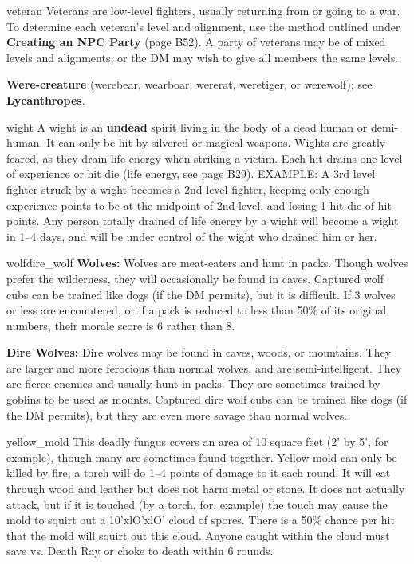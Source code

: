\documentclass[letterpaper,serif,tightsqueeze]{module}
\begin{document}
\begin{newmonster}{veteran}
Veterans are low-level fighters, usually returning from or going to a
war. To determine each veteran's level and alignment, use the
method outlined under \textbf{Creating an NPC Party} (page B52). A
party of veterans may be of mixed levels and alignments, or the
DM may wish to give all members the same levels.
\end{newmonster}
\textbf{Were-creature} (werebear, wearboar, wererat, weretiger, or werewolf); see \textbf{Lycanthropes}.\\[1ex]
\begin{newmonster}{wight}
A wight is an \textbf{undead} spirit living in the body of a dead human or
demi-human. It can only be hit by silvered or magical weapons.
Wights are greatly feared, as they drain life energy when striking a
victim. Each hit drains one level of experience or hit die (life
energy, see page B29). EXAMPLE: A 3rd level fighter struck by a
wight becomes a 2nd level fighter, keeping only enough experience
points to be at the midpoint of 2nd level, and losing 1 hit die
of hit points. Any person totally drained of life energy by a wight
will become a wight in 1--4 days, and will be under control of the
wight who drained him or her.
\end{newmonster}
\begin{newmonster2}{wolf}{dire_wolf}
\textbf{Wolves:} Wolves are meat-eaters and hunt in packs. Though
wolves prefer the wilderness, they will occasionally be found in
caves. Captured wolf cubs can be trained like dogs (if the DM permits),
but it is difficult. If 3 wolves or less are encountered, or if a
pack is reduced to less than 50\% of its original numbers, their
morale score is 6 rather than 8.

\textbf{Dire Wolves:} Dire wolves may be found in caves, woods, or
mountains. They are larger and more ferocious than normal
wolves, and are semi-intelligent. They are fierce enemies and
usually hunt in packs. They are sometimes trained by goblins to be
used as mounts. Captured dire wolf cubs can be trained like dogs
(if the DM permits), but they are even more savage than normal
wolves.
\end{newmonster2}
\begin{newmonster}{yellow_mold}
This deadly fungus covers an area of 10 square feet (2' by 5', for
example), though many are sometimes found together. Yellow
mold can only be killed by fire; a torch will do 1--4 points of damage
to it each round. It will eat through wood and leather but does not
harm metal or stone. It does not actually attack, but if it is touched
(by a torch, for. example) the touch may cause the mold to squirt
out a 10'xlO'xlO' cloud of spores. There is a 50\% chance per hit
that the mold will squirt out this cloud. Anyone caught within the
cloud must save vs. Death Ray or choke to death within 6 rounds.
\end{newmonster}
\end{document}
